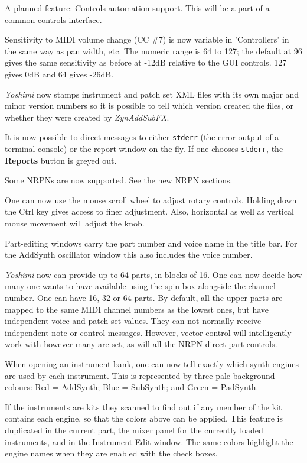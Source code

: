 \documentclass[
 11pt,
 twoside,
 a4paper,
 final                                 %
]{article}
\begin{document}
   A planned feature:
   Controls automation support.
   This will be a part of a common controls interface.

   Sensitivity to MIDI volume change (CC \#7) is now variable in 'Controllers' in
   the same way as pan width, etc. The numeric range is 64 to 127; the default
   at 96 gives the same sensitivity as before at -12dB relative to the GUI
   controls.  127 gives 0dB and 64 gives -26dB.

   \textsl{Yoshimi} now stamps instrument and patch set XML files with its own
   major and minor version numbers so it is possible to tell which version
   created the files, or whether they were created by \textsl{ZynAddSubFX}.

   It is now possible to direct messages to either \texttt{stderr}
   (the error output of a terminal console) or the report window
   on the fly. If one chooses \texttt{stderr}, the \textbf{Reports} button is
   greyed out.

   Some NRPNs are now supported.
   See the new NRPN sections.

   One can now use the mouse scroll wheel to adjust rotary controls. Holding
   down the Ctrl key gives access to finer adjustment.  Also, horizontal as
   well as vertical mouse movement will adjust the knob.

   Part-editing windows carry the part number and voice name in the title bar.
   For the AddSynth oscillator window this also includes the voice number.

   \textsl{Yoshimi} now can provide  up to 64 parts, in blocks of 16. One can
   now decide how many one wants to have available using the spin-box alongside
   the channel number.  One can have 16, 32 or 64 parts.  By default, all the
   upper parts are mapped to the same MIDI channel numbers as the lowest ones,
   but have independent voice and patch set values. They can not normally
   receive independent note or control messages. However, vector control will
   intelligently work with however many are set, as will all the NRPN direct
   part controls.

   When opening an instrument bank, one can now tell exactly which synth engines
   are used by each instrument. This is represented by three pale background
   colours: Red = AddSynth; Blue = SubSynth; and Green = PadSynth.

   If the instruments are kits they scanned to find out if any member of the
   kit contains each engine, so that the colors above can be applied.
   This feature is duplicated in the current part, the mixer panel for the
   currently loaded instruments, and in the Instrument Edit window.
   The same colors highlight the engine names when they are enabled with the
   check boxes. 
\end{document}
